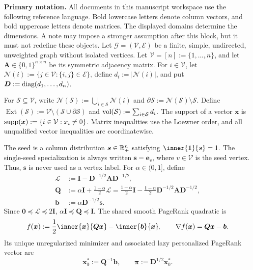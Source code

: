 \documentclass[11pt]{article}
\theoremstyle{definition}
\theoremstyle{remark}
\theoremstyle{plain}
\begin{document}
\textbf{Primary notation.}
All documents in this manuscript workspace use the following reference
language. Bold lowercase letters denote column vectors, and bold uppercase
letters denote matrices. The displayed domains determine the dimensions.
A note may impose a stronger assumption after this block, but it must not
redefine these objects. Let $\mathcal{G}=(\mathcal{V},\mathcal{E})$ be a
finite, simple, undirected, unweighted graph without isolated vertices. Let
$\mathcal{V}=[n]:=\{1,\ldots,n\}$, and let
$\bm{A}\in\{0,1\}^{n\times n}$ be its symmetric adjacency matrix. For
$i\in\mathcal{V}$, let
$\mathcal{N}(i):=\{j\in\mathcal{V}:\{i,j\}\in\mathcal{E}\}$, define
$d_i:=|\mathcal{N}(i)|$, and put
$\bm{D}:=\operatorname{diag}(d_1,\ldots,d_n)$.

For $\mathcal{S}\subseteq\mathcal{V}$, write
$\mathcal{N}(\mathcal{S}):=\bigcup_{i\in\mathcal{S}}\mathcal{N}(i)$ and
$\partial\mathcal{S}:=\mathcal{N}(\mathcal{S})\setminus\mathcal{S}$. Define
$\operatorname{Ext}(\mathcal{S}):=\mathcal{V}\setminus
(\mathcal{S}\cup\partial\mathcal{S})$ and
$\operatorname{vol}(\mathcal{S}):=\sum_{i\in\mathcal{S}}d_i$. The support of a vector
$\bm{x}$ is $\operatorname{supp}(\bm{x}):=\{i\in\mathcal{V}:x_i\neq0\}$.
Matrix inequalities use the Loewner order, and all unqualified vector
inequalities are coordinatewise.

The seed is a column distribution $\bm{s}\in\mathbb{R}_+^n$ satisfying
$\inner{\one}{\bm{s}}=1$.
The single-seed specialization is always written $\bm{s}=\bm{e}_v$, where
$v\in\mathcal{V}$ is the seed vertex. Thus, $\bm{s}$ is never used as a vertex
label. For $\alpha\in(0,1]$, define
\begin{equation}
\begin{aligned}
    \bm{\mathcal{L}}
        &:=\bm{I}-\bm{D}^{-1/2}\bm{A}\bm{D}^{-1/2},\\
    \bm{Q}
        &:=\alpha\bm{I}+\frac{1-\alpha}{2}\bm{\mathcal{L}}
          =\frac{1+\alpha}{2}\bm{I}
           -\frac{1-\alpha}{2}
            \bm{D}^{-1/2}\bm{A}\bm{D}^{-1/2},\\
    \bm{b}
        &:=\alpha\bm{D}^{-1/2}\bm{s}.
\end{aligned}
    \label{eq:shared-pagerank-matrices}
\end{equation}
Since $\bm{0}\preceq\bm{\mathcal{L}}\preceq2\bm{I}$,
$\alpha\bm{I}\preceq\bm{Q}\preceq\bm{I}$. The shared smooth PageRank
quadratic is
\begin{equation}
    f(\bm{x})
    :=\frac12\inner{\bm{x}}{\bm{Q}\bm{x}}
      -\inner{\bm{b}}{\bm{x}},
    \qquad
    \nabla f(\bm{x})=\bm{Q}\bm{x}-\bm{b}.
    \label{eq:shared-pagerank-objective}
\end{equation}
Its unique unregularized minimizer and associated lazy personalized PageRank
vector are
\begin{equation}
    \bm{x}_0^*:=\bm{Q}^{-1}\bm{b},
    \qquad
    \bm{\pi}:=\bm{D}^{1/2}\bm{x}_0^*.
    \label{eq:shared-ppr-solution}
\end{equation}
\end{document}
